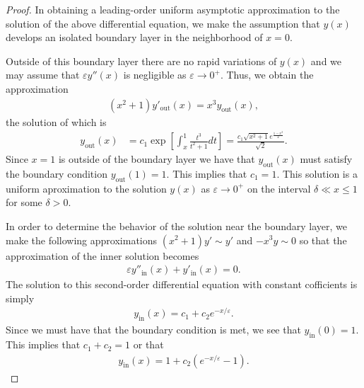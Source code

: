 \documentclass[12pt]{article}
\theoremstyle{definition}
\begin{document}
\begin{proof}
  In obtaining a leading-order uniform asymptotic approximation to the solution
  of the above differential equation, we make the assumption that $y(x)$ develops
  an isolated boundary layer in the neighborhood of $x=0$.

  Outside of this boundary layer there are no rapid variations of $y(x)$ and we
  may assume that $\varepsilon y''(x)$ is negligible as $\varepsilon \to 0^+$.
  Thus, we obtain the approximation
  \begin{align*}
    (x^2+1)y'_{\text{out}}(x) = x^3 y_{\text{out}}(x),
  \end{align*}
  the solution of which is
  \begin{align*}
    y_{\text{out}}(x) &= c_1\exp\left[\int_x^1 \frac{t^3}{t^2+1} dt\right] = \frac{c_1\sqrt{x^2+1}e^{\frac{1-x^2}{2}}}{\sqrt{2}}.
  \end{align*}
  Since $x=1$ is outside of the boundary layer we have that $y_{\text{out}}(x)$ must satisfy the boundary condition
  $y_{\text{out}}(1)=1$. This implies that $c_1 = 1$. This solution is a uniform aproximation
  to the solution $y(x)$ as $\varepsilon \to 0^+$ on the interval $\delta \ll x \leq 1$ for some $\delta > 0$.

  In order to determine the behavior of the solution near the boundary layer, we make the following
  approximations $(x^2 + 1)y' \sim y'$ and $-x^3y \sim 0$ so that the approximation of the inner solution becomes
  \begin{align*}
    \varepsilon y''_{\text{in}}(x) + y'_{\text{in}}(x) = 0.
  \end{align*}
  The solution to this second-order differential equation with constant cofficients is simply
  \begin{align*}
    y_{\text{in}}(x) = c_1 + c_2 e^{-x/\varepsilon}.
  \end{align*}
  Since we must have that the boundary condition is met, we see that $y_{\text{in}}(0) = 1$.
  This implies that $c_1 + c_2 = 1$ or that
  \begin{align*}
    y_{\text{in}}(x) = 1 + c_2\left(e^{-x/\varepsilon}-1\right).
  \end{align*}


\end{proof}
\end{document}
